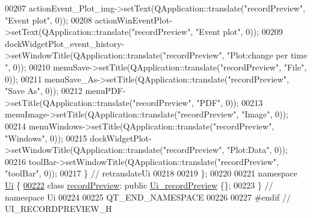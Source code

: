 \begin{DoxyCode}
00207         actionEvent\_Plot\_img->setText(QApplication::translate(\textcolor{stringliteral}{"recordPreview"}, \textcolor{stringliteral}{"Event plot"}, 0));
00208         actionWinEventPlot->setText(QApplication::translate(\textcolor{stringliteral}{"recordPreview"}, \textcolor{stringliteral}{"Event plot"}, 0));
00209         dockWidgetPlot\_event\_history->setWindowTitle(QApplication::translate(\textcolor{stringliteral}{"recordPreview"}, \textcolor{stringliteral}{"Plot:change
       per time "}, 0));
00210         menuSave->setTitle(QApplication::translate(\textcolor{stringliteral}{"recordPreview"}, \textcolor{stringliteral}{"File"}, 0));
00211         menuSave\_As->setTitle(QApplication::translate(\textcolor{stringliteral}{"recordPreview"}, \textcolor{stringliteral}{"Save As"}, 0));
00212         menuPDF->setTitle(QApplication::translate(\textcolor{stringliteral}{"recordPreview"}, \textcolor{stringliteral}{"PDF"}, 0));
00213         menuImage->setTitle(QApplication::translate(\textcolor{stringliteral}{"recordPreview"}, \textcolor{stringliteral}{"Image"}, 0));
00214         menuWindows->setTitle(QApplication::translate(\textcolor{stringliteral}{"recordPreview"}, \textcolor{stringliteral}{"Windows"}, 0));
00215         dockWidgetPlot->setWindowTitle(QApplication::translate(\textcolor{stringliteral}{"recordPreview"}, \textcolor{stringliteral}{"Plot:Data"}, 0));
00216         toolBar->setWindowTitle(QApplication::translate(\textcolor{stringliteral}{"recordPreview"}, \textcolor{stringliteral}{"toolBar"}, 0));
00217     \} \textcolor{comment}{// retranslateUi}
00218 
00219 \};
00220 
00221 \textcolor{keyword}{namespace }\hyperlink{a00055}{Ui} \{
\hypertarget{a00053_source_l00222}{}\hyperlink{a00021}{00222}     \textcolor{keyword}{class }\hyperlink{a00021}{recordPreview}: \textcolor{keyword}{public} \hyperlink{a00028}{Ui\_recordPreview} \{\};
00223 \} \textcolor{comment}{// namespace Ui}
00224 
00225 QT\_END\_NAMESPACE
00226 
00227 \textcolor{preprocessor}{#endif // UI\_RECORDPREVIEW\_H}
\end{DoxyCode}
